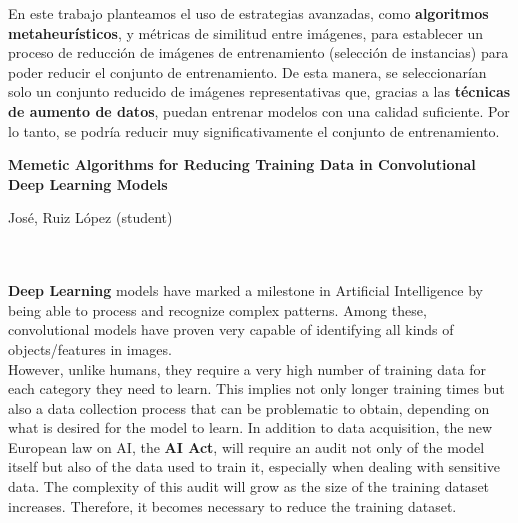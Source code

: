 En este trabajo planteamos el uso de estrategias avanzadas, como \textbf{algoritmos metaheurísticos}, y métricas de
similitud entre imágenes, para establecer un proceso de reducción de imágenes de entrenamiento (selección de
instancias) para poder reducir el conjunto de entrenamiento.
De esta manera, se seleccionarían solo un conjunto reducido de imágenes representativas que, gracias a las
\textbf{técnicas de aumento de datos}, puedan entrenar modelos con una calidad suficiente.
Por lo tanto, se podría reducir muy significativamente el conjunto de entrenamiento.\\[6pt]
\cleardoublepage


\thispagestyle{empty}


\begin{center}
{\large\bfseries Memetic Algorithms for Reducing Training Data in Convolutional Deep Learning Models}\\
\end{center}
\begin{center}
José, Ruiz López (student)\\
\end{center}

\\

\vspace{0.7cm}
\\

\textbf{Deep Learning} models have marked a milestone in Artificial Intelligence by being able to process and recognize
complex patterns.
Among these, convolutional models have proven very capable of identifying all kinds of objects/features in images.\\
[6pt]

However, unlike humans, they require a very high number of training data for each category they need to learn.
This implies not only longer training times but also a data collection process that can be problematic to obtain,
depending on what is desired for the model to learn.
In addition to data acquisition, the new European law on AI, the \textbf{AI Act}, will require an audit not only of the
model itself but also of the data used to train it, especially when dealing with sensitive data.
The complexity of this audit will grow as the size of the training dataset increases.
Therefore, it becomes necessary to reduce the training dataset.\\[6pt]

